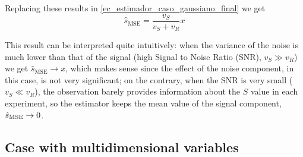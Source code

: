 \begin{example}
Replacing these results in \eqref{ec_estimador_caso_gaussiano_final} we get
\begin{equation}
\hat s_{\text{MSE}} = \frac{v_S}{v_S + v_R} x
\end{equation}

This result can be interpreted quite intuitively: when the variance of the noise is much lower than that of the signal (high Signal to Noise Ratio (SNR), $v_S \gg v_R$) we get $\hat s_{\text{MSE}} \to x$, which makes sense since the effect of the noise component, in this case, is not very significant; on the contrary, when the SNR is very small ($v_S \ll v_R$), the observation barely provides information about the $S$ value in each experiment, so the estimator keeps the mean value of the signal component, $\hat{s}_\text{MSE} \to 0$.
\end{example} %


\subsection{Case with multidimensional variables}

